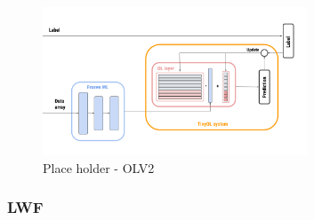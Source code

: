 \documentclass[12pt]{report}
\begin{document}
%
\begin{figure}[h!]
    \centering
    \includegraphics[width=0.7\textwidth]{Figures/Chapter3/OLV2.png} 
    \caption{Place holder - OLV2}
    \label{fig:block_diag_OLV2}    
\end{figure}
%
\subsubsection{LWF}
\end{document}
